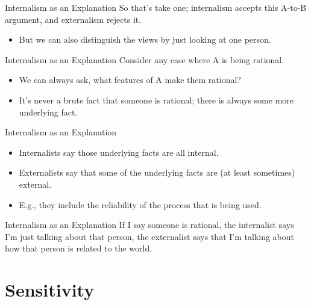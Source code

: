 \documentclass[
  17pt,
  letterpaper,
  ignorenonframetext,
  aspectratio=169,
]{beamer}
\providecommand{\tightlist}{%
  \setlength{\itemsep}{0pt}\setlength{\parskip}{0pt}}\usepackage{longtable,booktabs,array}
\begin{document}
\begin{frame}{Internalism as an Explanation}
\protect\hypertarget{internalism-as-an-explanation}{}
So that's take one; internalism accepts this A-to-B argument, and
externalism rejects it.

\begin{itemize}[<+->]
\tightlist
\item
  But we can also distinguish the views by just looking at one person.
\end{itemize}
\end{frame}

\begin{frame}{Internalism as an Explanation}
\protect\hypertarget{internalism-as-an-explanation-1}{}
Consider any case where A is being rational.

\begin{itemize}[<+->]
\tightlist
\item
  We can always ask, what features of A make them rational?
\item
  It's never a brute fact that someone is rational; there is always some
  more underlying fact.
\end{itemize}
\end{frame}

\begin{frame}{Internalism as an Explanation}
\protect\hypertarget{internalism-as-an-explanation-2}{}
\begin{itemize}[<+->]
\tightlist
\item
  Internalists say those underlying facts are all internal.
\item
  Externalists say that some of the underlying facts are (at least
  sometimes) external.
\item
  E.g., they include the reliability of the process that is being used.
\end{itemize}
\end{frame}

\begin{frame}{Internalism as an Explanation}
\protect\hypertarget{internalism-as-an-explanation-3}{}
If I say someone is rational, the internalist says I'm just talking
about that person, the externalist says that I'm talking about how that
person is related to the world.
\end{frame}

\hypertarget{sensitivity}{%
\section{Sensitivity}\label{sensitivity}}
\end{document}
